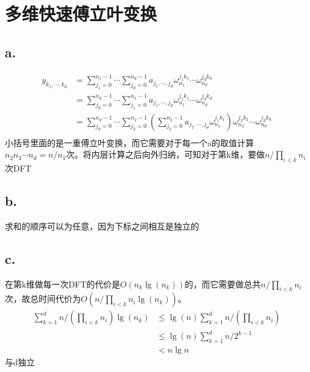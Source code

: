 \documentclass[]{report}
\begin{document}
	\section{多维快速傅立叶变换}
	\subsection{a.}
	\[\begin{aligned}
		y_{k_1,\cdots,k_d}
		&=\sum_{j_1=0}^{n_1-1}\cdots\sum_{j_d=0}^{n_d-1}a_{j_1,\cdots,j_d}\omega_{n_1}^{j_1k_1}\cdots\omega_{n_d}^{j_dk_d}\\
		&=\sum_{j_d=0}^{n_d-1}\cdots\sum_{j_1=0}^{n_1-1}a_{j_1,\cdots,j_d}\omega_{n_1}^{j_1k_1}\cdots\omega_{n_d}^{j_dk_d}\\
		&=\sum_{j_d=0}^{n_d-1}\cdots\sum_{j_2=0}^{n_2-1}\left(\sum_{j_2=0}^{n_2-1}a_{j_1,\cdots,j_d}\omega_{n_1}^{j_1k_1}\right)\omega_{n_2}^{j_2k_2}\cdots\omega_{n_d}^{j_dk_d}\\
	\end{aligned}\]
	小括号里面的是一重傅立叶变换，而它需要对于每一个a的取值计算$n_2n_3\cdots n_d=n/n_1$次。将内层计算之后向外归纳，可知对于第k维，要做$n/\prod_{i<k}n_i$次DFT
	\subsection{b.}
	求和的顺序可以为任意，因为下标之间相互是独立的
	\subsection{c.}
	在第k维做每一次DFT的代价是$O(n_k\lg(n_k))$的，而它需要做总共$n/\prod_{i<k}n_i$次，故总时间代价为$O(n/\prod_{i<k}n_i\lg(n_k))$。
	\[\begin{aligned}
		\sum_{k=1}^dn/\left(\prod_{i<k}n_i\right)\lg(n_k)
		&\le \lg(n)\sum_{k=1}^dn/\left(\prod_{i<k}n_i\right)\\
		&\le \lg(n)\sum_{k=1}^dn/2^{k-1}\\
		&<n\lg n
	\end{aligned}\]与d独立
\end{document}
